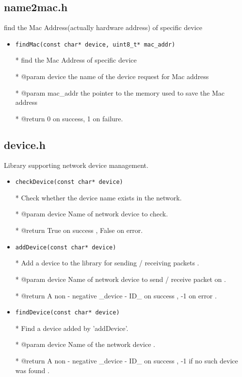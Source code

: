 \documentclass[11pt]{article}
\begin{document}
	\subsection*{name2mac.h}
		\par find the Mac Address(actually hardware address) of specific device
	\begin{itemize}
		\item \texttt{findMac(const char* device, uint8\_t* mac\_addr)}
		
		* find the Mac Address of specific device
		
		* @param device the name of the device request for Mac address
		
		* @param mac\_addr the pointer to the memory used to save the
		Mac address
		
		* @return 0 on success, 1 on failure.
	\end{itemize}
	
		
	\subsection*{device.h}
		\par Library supporting network device management.
		\begin{itemize}
			\item \texttt{checkDevice(const char* device)}
			
			* Check whether the device name exists in the network.
			
			* @param device Name of network device to check.
			
			* @return True on success , False on error.
			
			
			\item \texttt{addDevice(const char* device)}
			
			* Add a device to the library for sending / receiving packets .
			
			* @param device Name of network device to send / receive packet on .
			
			* @return A non - negative \_device - ID\_ on success , -1 on error .
			
			\item \texttt{findDevice(const char* device)}
			
			* Find a device added by 'addDevice'.
			
			* @param device Name of the network device .
			
			* @return A non - negative \_device - ID\_ on success , -1 if no such device was found .
		\end{itemize}
		
\end{document}
